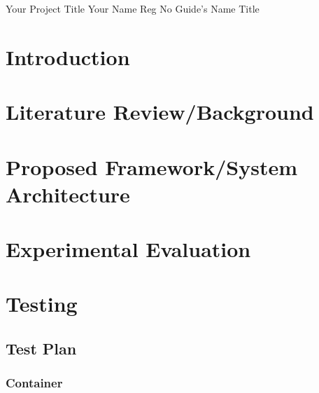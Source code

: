 \documentclass{vitmsprojectreport}
\begin{document}
\maketitlepage%
{Your Project Title}%
{Your Name}%
{Reg No}%
{Guide's Name}%
{Title}%

\makedeclarationpage%

\makebonafidepage%

\makeackpage%

\makeexecsummarypage%

\tableofcontents  %
\clearpage
\listoffigures    %
\clearpage
\listoftables     %
\clearpage

\chapter{Introduction}

\chapter{Literature Review/Background}

\chapter{Proposed Framework/System Architecture}

\chapter{Experimental Evaluation}

\chapter{Testing}

\section{Test Plan}

\subsection{Container}
\end{document}
